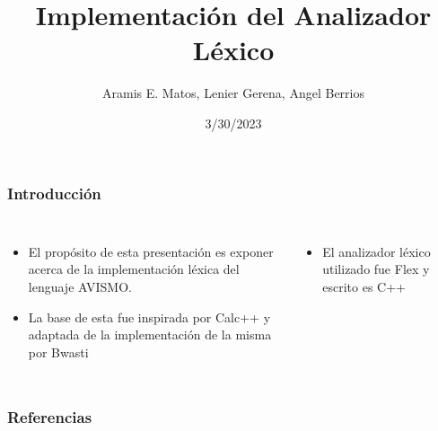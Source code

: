\documentclass[14pt, aspectratio=169]{beamer}
\title{Implementación del Analizador Léxico}
\author{Aramis E. Matos, Lenier Gerena, Angel Berrios}
\date{3/30/2023}
\begin{document}
\maketitle

\begin{frame}
    \frametitle{Introducción}
    \begin{columns}
        \small
        \begin{itemize}
            \item El propósito de esta presentación es exponer acerca de la implementación léxica del lenguaje AVISMO.
            \item La base de esta fue inspirada por Calc++ \cite{noauthor_complete_nodate} y adaptada de la implementación de la misma por Bwasti \cite{wasti_bwastibison-example-calc-_2020}
        \end{itemize}
        \begin{itemize}
            \item El analizador léxico utilizado fue Flex \cite{noauthor_flex_nodate} y escrito es C++
        \end{itemize}
    \end{columns}
\end{frame}


\begin{frame}
    \frametitle{Referencias}
    
    
\end{frame}
\end{document}
